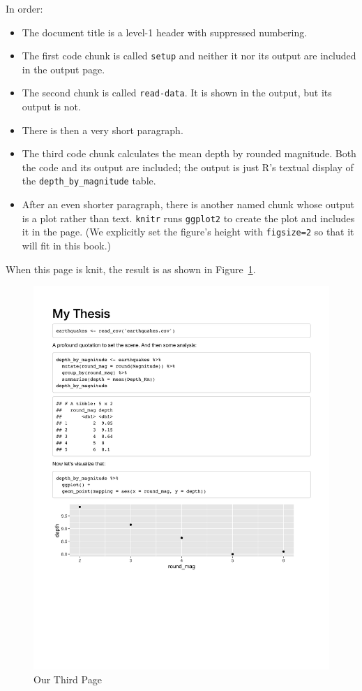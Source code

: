In order:

\begin{itemize}
\item
  The document title is a level-1 header with suppressed numbering.
\item
  The first code chunk is called \texttt{setup}
  and neither it nor its output are included in the output page.
\item
  The second chunk is called \texttt{read-data}.
  It is shown in the output,
  but its output is not.
\item
  There is then a very short paragraph.
\item
  The third code chunk calculates the mean depth by rounded magnitude.
  Both the code and its output are included;
  the output is just R's textual display of the \texttt{depth\_by\_magnitude} table.
\item
  After an even shorter paragraph,
  there is another named chunk whose output is a plot rather than text.
  \texttt{knitr} runs \texttt{ggplot2} to create the plot and includes it in the page.
  (We explicitly set the figure's height with \texttt{figsize=2} so that it will fit in this book.)
\end{itemize}

When this page is knit,
the result is as shown in Figure~\ref{fig:third-page}.

\begin{figure}[h]
  \includegraphics{figures/rmarkdown/third-page.pdf}
  \caption{Our Third Page}
  \label{fig:third-page}
\end{figure}

